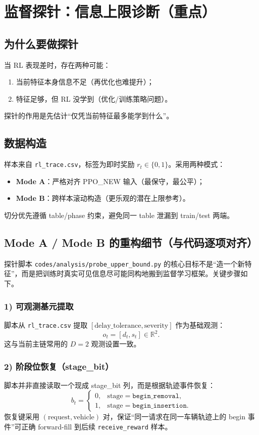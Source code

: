 ﻿\documentclass[11pt,a4paper]{ctexart}
\begin{document}
\section{监督探针：信息上限诊断（重点）}
\subsection{为什么要做探针}
当 RL 表现差时，存在两种可能：
\begin{enumerate}[leftmargin=*]
  \item 当前特征本身信息不足（再优化也难提升）；
  \item 特征足够，但 RL 没学到（优化/训练策略问题）。
\end{enumerate}
探针的作用是先估计“仅凭当前特征最多能学到什么”。

\subsection{数据构造}
样本来自 \texttt{rl\_trace.csv}，标签为即时奖励 $r_t\in\{0,1\}$。采用两种模式：
\begin{itemize}
  \item \textbf{Mode A}：严格对齐 PPO\_NEW 输入（最保守，最公平）；
  \item \textbf{Mode B}：跨样本滚动构造（更乐观的潜在上限参考）。
\end{itemize}

切分优先遵循 table/phase 约束，避免同一 table 泄漏到 train/test 两端。

\subsection{Mode A / Mode B 的重构细节（与代码逐项对齐）}
探针脚本 \texttt{codes/analysis/probe\_upper\_bound.py} 的核心目标不是“造一个新特征”，而是把训练时真实可见信息尽可能同构地搬到监督学习框架。关键步骤如下。

\subsubsection*{1) 可观测基元提取}
脚本从 \texttt{rl\_trace.csv} 提取
\(
[\text{delay\_tolerance},\text{severity}]
\)
作为基础观测：
\begin{equation}
o_t=[d_t,s_t]\in\mathbb{R}^2.
\end{equation}
这与当前主链常用的 $D=2$ 观测设置一致。

\subsubsection*{2) 阶段位恢复（stage\_bit）}
脚本并非直接读取一个现成 stage\_bit 列，而是根据轨迹事件恢复：
\begin{equation}
b_t=
\begin{cases}
0,&\text{stage}=\texttt{begin\_removal},\\
1,&\text{stage}=\texttt{begin\_insertion}.
\end{cases}
\end{equation}
恢复键采用
\(
(\text{request},\text{vehicle})
\)
对，保证“同一请求在同一车辆轨迹上的 begin 事件”可正确 forward-fill 到后续 \texttt{receive\_reward} 样本。
\end{document}
